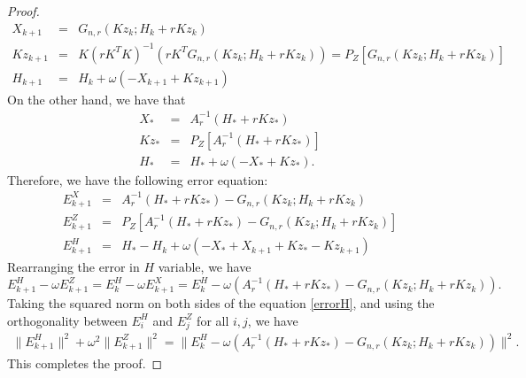 \begin{itemize}
\begin{proof}
\begin{eqnarray*}
X_{k+1} &=& G_{n,r} (Kz_k; H_k + r K z_k) \\
Kz_{k+1} &=& K(rK^TK)^{-1} (rK^T G_{n,r} (Kz_k;H_k + r K z_k)) = P_Z [G_{n,r} (Kz_k; H_k + r K z_k)]  \\ 
H_{k+1} &=& H_k + \omega (-X_{k+1} + Kz_{k+1} )
\end{eqnarray*}
On the other hand, we have that 
\begin{eqnarray*}
X_{*} &=& A_r^{-1} (H_* + r K z_*) \\
Kz_{*} &=& P_Z [A_r^{-1}(H_* + rK z_*)] \\ 
H_{*} &=& H_* + \omega (-X_{*} + K z_{*}). 
\end{eqnarray*}
Therefore, we have the following error equation: 
\begin{eqnarray*}
E_{k+1}^X &=& A_r^{-1} (H_* + r K z_*) - G_{n,r} (Kz_k; H_k + r K z_k) \\
E_{k+1}^Z &=& P_Z [ A_r^{-1} (H_* + rK z_*) - G_{n,r}(Kz_k; H_k + rK z_k) ] \\
E_{k+1}^H &=& H_* - H_k + \omega (-X_* + X_{k+1} + Kz_{*} - K z_{k+1})
\end{eqnarray*}
Rearranging the error in $H$ variable, we have 
\begin{equation}\label{errorH}
E_{k+1}^H - \omega E_{k+1}^Z = E_k^H - \omega E_{k+1}^X = E_k^H - \omega \left( A_r^{-1} (H_* + r K z_*) - G_{n,r}(Kz_k; H_k + r K z_k) \right).    
\end{equation}
Taking the squared norm on both sides of the equation \eqref{errorH}, and using the orthogonality between $E_i^H$ and $E_j^Z$ for all $i,j$, we have 
\begin{eqnarray*}
\|E_{k+1}^H\|^2 + \omega^2 \|E_{k+1}^Z\|^2 = \|E_k^H - \omega (A_r^{-1} (H_* + r K z_*) - G_{n,r} (Kz_k; H_k + r K z_k))\|^2. 
\end{eqnarray*}
This completes the proof. 



\end{proof}
\end{itemize}
